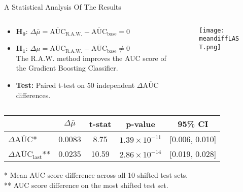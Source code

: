 \begin{frame}{A Statistical Analysis Of The Results}
    \begin{columns}[T]
        \begin{column}{0.6\textwidth}
            \begin{itemize}
                \item $\boldsymbol{H_0}$: $\Delta\bar{\mu} = \overline{\text{AUC}}_{\text{R.A.W.}} - \overline{\text{AUC}}_{\text{base}} = 0$ \\        
                \item $\boldsymbol{H_1}$: $\Delta\bar{\mu} = \overline{\text{AUC}}_{\text{R.A.W.}} - \overline{\text{AUC}}_{\text{base}} \neq 0$ \\
                \quad The R.A.W. method improves the AUC score of the Gradient Boosting Classifier.
                
                \item \textbf{Test:} Paired t-test on 50 independent $\Delta\overline{\text{AUC}}$ differences.
            \end{itemize}
            
            
            
            
        \end{column}
        
        \begin{column}{0.4\textwidth}
            \vspace{1em}
            \begin{figure}
                \centering
                \texttt{[image: meandiffLAST.png]}
            \end{figure}
        \end{column}
    \end{columns}

    \begin{table}
        \centering
        \small
        \begin{tabular}{lcccc}
            \toprule
            & $\Delta\bar{\mu}$ & t-stat & p-value & 95\% CI \\
            \midrule
            $\Delta\overline{\text{AUC}}$* & 0.0083 & 8.75  & $1.39 \times 10^{-11}$ & [0.006, 0.010] \\
            $\Delta\overline{\text{AUC}}_{\text{last}}$** & 0.0235 & 10.59 & $2.86 \times 10^{-14}$ & [0.019, 0.028] \\
            \bottomrule
        \end{tabular}
    \end{table}
    
    \begin{footnotesize}
        * Mean AUC score difference across all 10 shifted test sets. \\
        ** AUC score difference on the most shifted test set.
    \end{footnotesize}
\end{frame}


    
